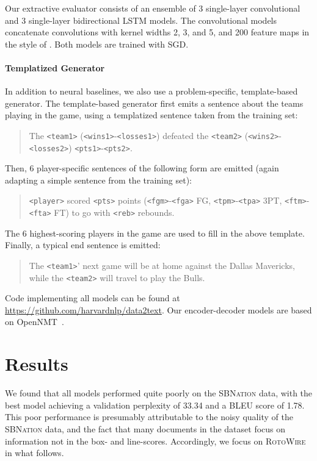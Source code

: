 \documentclass[11pt,letterpaper]{article}
\begin{document}
Our extractive evaluator consists of an ensemble of 3 single-layer
convolutional and 3 single-layer bidirectional LSTM models. The convolutional models
concatenate convolutions with kernel widths 2, 3, and 5, and 200
feature maps in the style of \cite{kim2014convolutional}.
Both models are trained with SGD.

\paragraph{Templatized Generator} In addition to neural baselines, we also use a problem-specific,
template-based generator. The template-based generator first emits a sentence about the teams playing in the game, using a templatized
sentence taken from the training set:

\begin{quote}
{\small The \texttt{<team1>} (\texttt{<wins1>}-\texttt{<losses1>}) defeated the \texttt{<team2>} (\texttt{<wins2>}-\texttt{<losses2>}) \texttt{<pts1>}-\texttt{<pts2>}. }
\end{quote}

\noindent Then, 6 player-specific sentences of the following form are emitted (again adapting a simple sentence from the training set):
\begin{quote}
{\small \texttt{<player>} scored \texttt{<pts>} points (\texttt{<fgm>}-\texttt{<fga>} FG, \texttt{<tpm>}-\texttt{<tpa>} 3PT, \texttt{<ftm>}-\texttt{<fta>} FT) to go with \texttt{<reb>} rebounds. }
\end{quote}

\noindent The 6 highest-scoring players in the game are used to fill in the above template. Finally, a typical end sentence is emitted:

\begin{quote}
{\small The \texttt{<team1>}' next game will be at home against the Dallas Mavericks, while the \texttt{<team2>} will travel to play the Bulls.}
\end{quote}


Code implementing all models can be found at \url{https://github.com/harvardnlp/data2text}. Our encoder-decoder models are based on OpenNMT~\cite{opennmt}.

\section{Results}
We found that all models performed quite poorly on the \textsc{SBNation} data, with the best model achieving a validation perplexity of 33.34 and a BLEU score of 1.78. This poor performance is presumably attributable to the noisy quality of the \textsc{SBNation} data, and the fact that many documents in the dataset focus on information not in the box- and line-scores. Accordingly, we focus on \textsc{RotoWire} in what follows. 
\end{document}
